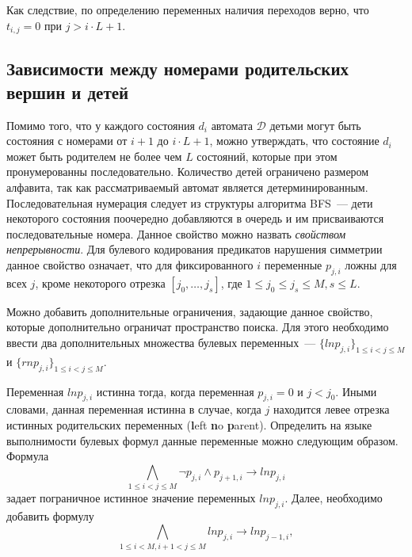 Как следствие, по определению переменных наличия переходов верно, что $t_{i, j} = 0$ при $j > i \cdot L + 1$.



\subsection{Зависимости между номерами родительских вершин и детей}
\label{sec:space:pruning:continuity}

Помимо того, что у каждого состояния $d_{i}$ автомата $\mathcal{D}$ детьми могут быть состояния с номерами от $i + 1$ до $i \cdot L + 1$, можно утверждать, что состояние $d_{i}$ может быть родителем не более чем $L$ состояний, которые при этом пронумерованны последовательно.
Количество детей ограничено размером алфавита, так как рассматриваемый автомат является детерминированным.
Последовательная нумерация следует из структуры алгоритма BFS~{---} дети некоторого состояния поочередно добавляются в очередь и им присваиваются последовательные номера.
Данное свойство можно назвать \emph{свойством непрерывности}.
Для булевого кодирования предикатов нарушения симметрии данное свойство означает, что для фиксированного $i$ переменные $p_{j,i}$ ложны для всех $j$, кроме некоторого отрезка $[j_{0},\ldots,j_{s}]$, где $1 \leq j_{0} \leq j_{s} \leq M, s\leq L$.

Можно добавить дополнительные ограничения, задающие данное свойство, которые дополнительно ограничат пространство поиска.
Для этого необходимо ввести два дополнительных множества булевых переменных~{---} $\{\mathit{lnp}_{j,i}\}_{1 \leq i < j \leq M}$ и  $\{\mathit{rnp}_{j,i}\}_{1 \leq i < j \leq M}$.

Переменная $\mathit{lnp}_{j,i}$ истинна тогда, когда переменная $p_{j,i} = 0$ и $j < j_{0}$.
Иными словами, данная переменная истинна в случае, когда $j$ находится левее отрезка истинных родительских переменных (\textbf{l}eft \textbf{n}o \textbf{p}arent).
Определить на языке выполнимости булевых формул данные переменные можно следующим образом.
Формула
\begin{equation*}
\bigwedge_{1 \leq i < j \leq M} \neg p_{j,i} \wedge p_{j + 1, i} \rightarrow \mathit{lnp}_{j,i}
\end{equation*}
задает пограничное истинное значение переменных $\mathit{lnp}_{j,i}$.
Далее, необходимо добавить формулу
\begin{equation*}
\bigwedge_{1 \leq i < M, i + 1 < j \leq M} \mathit{lnp}_{j,i} \rightarrow \mathit{lnp}_{j - 1, i},
\end{equation*}

